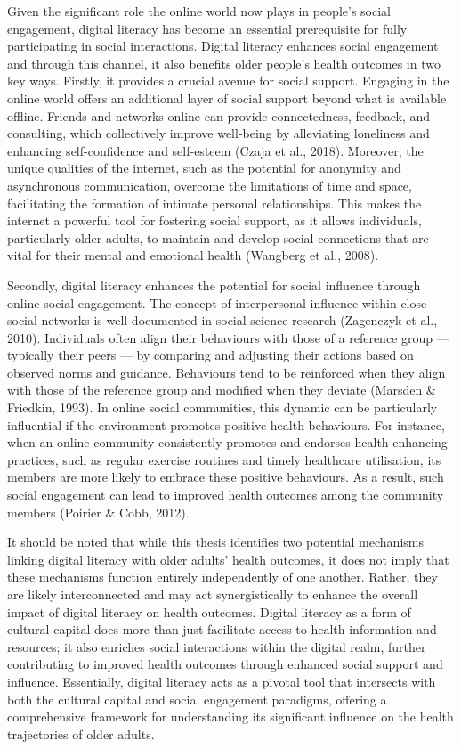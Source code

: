 Given the significant role the online world now plays in people's social engagement, digital literacy has become an essential prerequisite for fully participating in social interactions. Digital literacy enhances social engagement and through this channel, it also benefits older people's health outcomes in two key ways. Firstly, it provides a crucial avenue for social support. Engaging in the online world offers an additional layer of social support beyond what is available offline. Friends and networks online can provide connectedness, feedback, and consulting, which collectively improve well-being by alleviating loneliness and enhancing self-confidence and self-esteem (Czaja et al., 2018). Moreover, the unique qualities of the internet, such as the potential for anonymity and asynchronous communication, overcome the limitations of time and space, facilitating the formation of intimate personal relationships. This makes the internet a powerful tool for fostering social support, as it allows individuals, particularly older adults, to maintain and develop social connections that are vital for their mental and emotional health (Wangberg et al., 2008).

Secondly, digital literacy enhances the potential for social influence through online social engagement. The concept of interpersonal influence within close social networks is well-documented in social science research (Zagenczyk et al., 2010). Individuals often align their behaviours with those of a reference group — typically their peers — by comparing and adjusting their actions based on observed norms and guidance. Behaviours tend to be reinforced when they align with those of the reference group and modified when they deviate (Marsden \& Friedkin, 1993). In online social communities, this dynamic can be particularly influential if the environment promotes positive health behaviours. For instance, when an online community consistently promotes and endorses health-enhancing practices, such as regular exercise routines and timely healthcare utilisation, its members are more likely to embrace these positive behaviours. As a result, such social engagement can lead to improved health outcomes among the community members (Poirier \& Cobb, 2012).

It should be noted that while this thesis identifies two potential mechanisms linking digital literacy with older adults' health outcomes, it does not imply that these mechanisms function entirely independently of one another. Rather, they are likely interconnected and may act synergistically to enhance the overall impact of digital literacy on health outcomes. Digital literacy as a form of cultural capital does more than just facilitate access to health information and resources; it also enriches social interactions within the digital realm, further contributing to improved health outcomes through enhanced social support and influence. Essentially, digital literacy acts as a pivotal tool that intersects with both the cultural capital and social engagement paradigms, offering a comprehensive framework for understanding its significant influence on the health trajectories of older adults.

